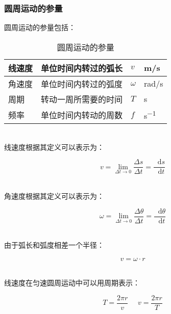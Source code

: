 \documentclass[UTF8]{ctexart}
\newcommand*{\dif}{\mathop{}\!\mathrm{d}}
\begin{document}
\subsubsection{圆周运动的参量}
    圆周运动的参量包括：
    \begin{table}[h]
        \begin{center}
            \begin{tabular}{p{80pt}|p{140pt}|p{60pt}|p{60pt}}
                \hline
                线速度&单位时间内转过的弧长&$v$&\si{m/s}\\ \hline
                角速度&单位时间内转过的弧度&$\omega$&\si{rad/s}\\ \hline
                周期&转动一周所需要的时间&$T$&\si{s}\\ \hline
                频率&单位时间内转动的周数&$f$&\si{s^{-1}}\\ \hline
            \end{tabular}
            \caption{圆周运动的参量}
        \end{center}
    \end{table}\\
    线速度根据其定义可以表示为：
    \begin{large}
        \begin{equation*}
            v=\lim_{\Delta t\rightarrow 0}\frac{\Delta s}{\Delta t}=\frac{\dif s}{\dif t}
        \end{equation*}
    \end{large}\\
    角速度根据其定义可以表示为：
    \begin{large}
        \begin{equation*}
            \omega=\lim_{\Delta t\rightarrow 0}\frac{\Delta\theta}{\Delta t}=\frac{\dif\theta}{\dif t}
        \end{equation*}
    \end{large}\\
    由于弧长和弧度相差一个半径：
    \begin{large}
        \begin{equation*}
            v=\omega\cdot r
        \end{equation*}
    \end{large}\\
    线速度在匀速圆周运动中可以用周期表示：
    \begin{large}
        \begin{equation*}
            T=\frac{2\pi r}{v}~~~~~~v=\frac{2\pi r}{T}
        \end{equation*}
    \end{large}\\
\end{document}
